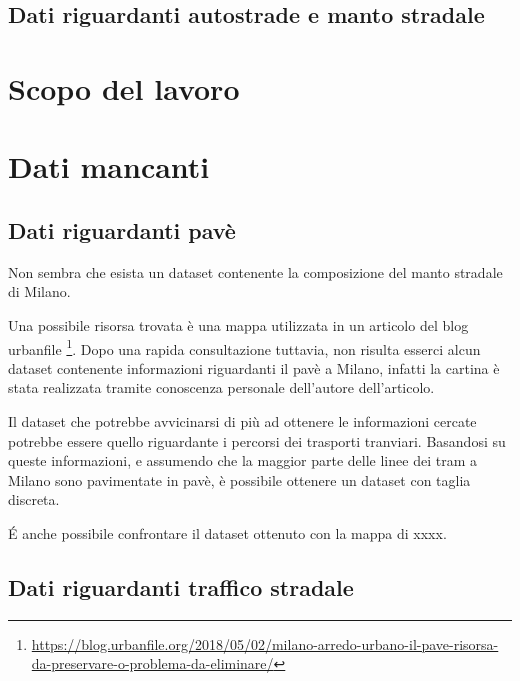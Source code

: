 \documentclass[a4paper]{report}
\begin{document}
\subsection{Dati riguardanti autostrade e manto stradale}

\section{Scopo del lavoro}

\section{Dati mancanti}

\subsection{Dati riguardanti pavè}
Non sembra che esista un dataset contenente la composizione del manto stradale di Milano.

Una possibile risorsa trovata è una mappa utilizzata in un articolo del blog urbanfile
\footnote{\url{https://blog.urbanfile.org/2018/05/02/milano-arredo-urbano-il-pave-risorsa-da-preservare-o-problema-da-eliminare/}}.
Dopo una rapida consultazione tuttavia, non risulta esserci alcun dataset contenente informazioni 
riguardanti il pavè a Milano, infatti la cartina è stata realizzata tramite conoscenza personale dell'autore dell'articolo.

Il dataset che potrebbe avvicinarsi di più ad ottenere le informazioni cercate potrebbe essere 
quello riguardante i percorsi dei trasporti tranviari. Basandosi su queste informazioni, e assumendo che 
la maggior parte delle linee dei tram a Milano sono pavimentate in pavè, è possibile ottenere un dataset con taglia discreta.

\'E anche possibile confrontare il dataset ottenuto con la mappa di xxxx.

\subsection{Dati riguardanti traffico stradale}


\end{document}

